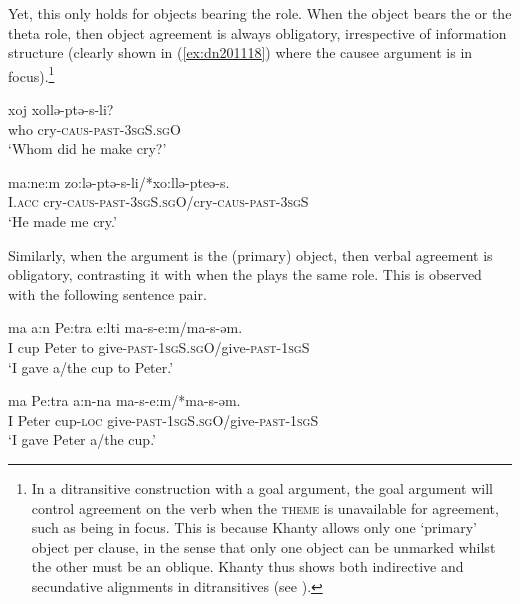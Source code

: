 \documentclass[output=paper
,modfonts
,nonflat]{langsci/langscibook}
\begin{document}
Yet, this only holds for objects bearing the \theme {} role.
When the object bears the \goal {} or the \causee {} theta role, then object agreement is always obligatory, irrespective of information structure (clearly shown in (\ref{ex:dn201118}) where the causee argument is in focus).\footnote{In a ditransitive construction with a goal argument, the goal argument will control agreement on the verb when the \textsc{theme} is unavailable for agreement, such as being in focus.
This is because Khanty allows only one `primary' object per clause, in the sense that only one object can be unmarked whilst the other must be an oblique.
Khanty thus shows both indirective and secundative alignments in ditransitives (see \citealt{haspelmath2005,Barany2015}).
} 

\begin{exe}
\ex \citet[][149]{dn2011}
\begin{xlist}
\ex
{\gll xoj xollə-ptə-s-li?\\
who cry-\textsc{caus-past-3sgS.sgO}\\
\glt `Whom did he make cry?'} \label{ex:dn201118}

\ex
{\gll ma:ne:m zo:lə-ptə-s-li/*xo:llə-pteə-s.\\
I.\textsc{acc} cry-\textsc{caus-past-3sgS.sgO}/cry-\textsc{caus-past-3sgS}\\
\glt `He made me cry.'} \label{ex:dn201119}

\end{xlist}
\end{exe}

\noindent Similarly, when the \goal {} argument is the (primary) object, then verbal agreement is obligatory, contrasting it with when the \theme {} plays the same role. 
This is observed with the following sentence pair. 

\begin{exe}
\ex \citet[][148]{dn2011}
\begin{xlist}
\ex
{\gll ma a:n Pe:tra e:lti ma-s-e:m/ma-s-əm.\\
I cup Peter to give-\textsc{past-1sgS.sgO}/give-\textsc{past-1sgS}\\
\glt `I gave a/the cup to Peter.'}

\ex
{\gll ma Pe:tra a:n-na ma-s-e:m/*ma-s-əm.\\
I Peter cup-\textsc{loc} give-\textsc{past-1sgS.sgO}/give-\textsc{past-1sgS}\\
\glt `I gave Peter a/the cup.'}
\end{xlist}
\end{exe}
\end{document}
